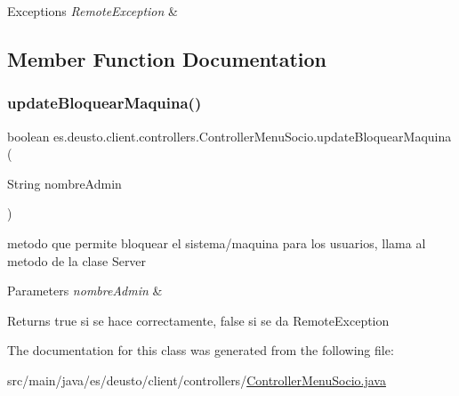 \begin{DoxyExceptions}{Exceptions}
{\em Remote\+Exception} & \\
\hline
\end{DoxyExceptions}


\subsection{Member Function Documentation}
\mbox{\label{classes_1_1deusto_1_1client_1_1controllers_1_1_controller_menu_socio_a319cf89fcc5811cfe9e1e34ef96f06bf}} 
\subsubsection{\texorpdfstring{updateBloquearMaquina()}{updateBloquearMaquina()}}
{\footnotesize\ttfamily boolean es.\+deusto.\+client.\+controllers.\+Controller\+Menu\+Socio.\+update\+Bloquear\+Maquina (\begin{DoxyParamCaption}\item[{String}]{nombre\+Admin }\end{DoxyParamCaption})}

metodo que permite bloquear el sistema/maquina para los usuarios, llama al metodo de la clase Server 
\begin{DoxyParams}{Parameters}
{\em nombre\+Admin} & \\
\hline
\end{DoxyParams}
\begin{DoxyReturn}{Returns}
true si se hace correctamente, false si se da Remote\+Exception 
\end{DoxyReturn}


The documentation for this class was generated from the following file\+:\begin{DoxyCompactItemize}
\item 
src/main/java/es/deusto/client/controllers/\mbox{\hyperlink{_controller_menu_socio_8java}{Controller\+Menu\+Socio.\+java}}\end{DoxyCompactItemize}
